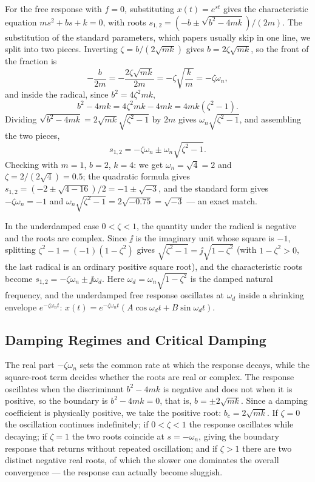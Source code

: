For the free response with $f=0$, substituting $x(t)=e^{st}$ gives the
characteristic equation $ms^2+bs+k=0$, with roots
$s_{1,2}=(-b\pm\sqrt{b^2-4mk})/(2m)$.
The substitution of the standard parameters, which papers usually skip in
one line, we split into two pieces.
Inverting $\zeta=b/(2\sqrt{mk})$ gives $b=2\zeta\sqrt{mk}$, so the front
of the fraction is
\begin{equation}
  -\frac{b}{2m}=-\frac{2\zeta\sqrt{mk}}{2m}=-\zeta\sqrt{\frac{k}{m}}=-\zeta\omega_n,
\end{equation}
and inside the radical, since $b^2=4\zeta^2 mk$,
\begin{equation}
  b^2-4mk=4\zeta^2 mk-4mk=4mk(\zeta^2-1).
\end{equation}
Dividing $\sqrt{b^2-4mk}=2\sqrt{mk}\sqrt{\zeta^2-1}$ by $2m$ gives
$\omega_n\sqrt{\zeta^2-1}$, and assembling the two pieces,
\begin{equation}
  s_{1,2}=-\zeta\omega_n\pm\omega_n\sqrt{\zeta^2-1}.
  \label{eq:u5m-roots}
\end{equation}
Checking with $m=1$, $b=2$, $k=4$: we get $\omega_n=\sqrt{4}=2$ and
$\zeta=2/(2\sqrt{4})=0.5$; the quadratic formula gives
$s_{1,2}=(-2\pm\sqrt{4-16})/2=-1\pm\sqrt{-3}$, and the standard form gives
$-\zeta\omega_n=-1$ and $\omega_n\sqrt{\zeta^2-1}=2\sqrt{-0.75}=\sqrt{-3}$
--- an exact match.

In the underdamped case $0<\zeta<1$, the quantity under the radical is
negative and the roots are complex.
Since $\jj$ is the imaginary unit whose square is $-1$, splitting
$\zeta^2-1=(-1)(1-\zeta^2)$ gives
$\sqrt{\zeta^2-1}=\jj\sqrt{1-\zeta^2}$ (with $1-\zeta^2>0$, the last
radical is an ordinary positive square root), and the characteristic
roots become $s_{1,2}=-\zeta\omega_n\pm\jj\omega_d$.
Here $\omega_d=\omega_n\sqrt{1-\zeta^2}$ is the damped natural frequency,
and the underdamped free response oscillates at $\omega_d$ inside a
shrinking envelope $e^{-\zeta\omega_n t}$:
$x(t)=e^{-\zeta\omega_n t}(A\cos\omega_d t+B\sin\omega_d t)$.

\subsection{Damping Regimes and Critical Damping}

The real part $-\zeta\omega_n$ sets the common rate at which the response
decays, while the square-root term decides whether the roots are real or
complex.
The response oscillates when the discriminant $b^2-4mk$ is negative and
does not when it is positive, so the boundary is $b^2-4mk=0$, that is,
$b=\pm2\sqrt{mk}$.
Since a damping coefficient is physically positive, we take the positive
root: $b_c=2\sqrt{mk}$.
If $\zeta=0$ the oscillation continues indefinitely; if $0<\zeta<1$ the
response oscillates while decaying; if $\zeta=1$ the two roots coincide at
$s=-\omega_n$, giving the boundary response that returns without repeated
oscillation; and if $\zeta>1$ there are two distinct negative real roots,
of which the slower one dominates the overall convergence --- the response
can actually become sluggish.

